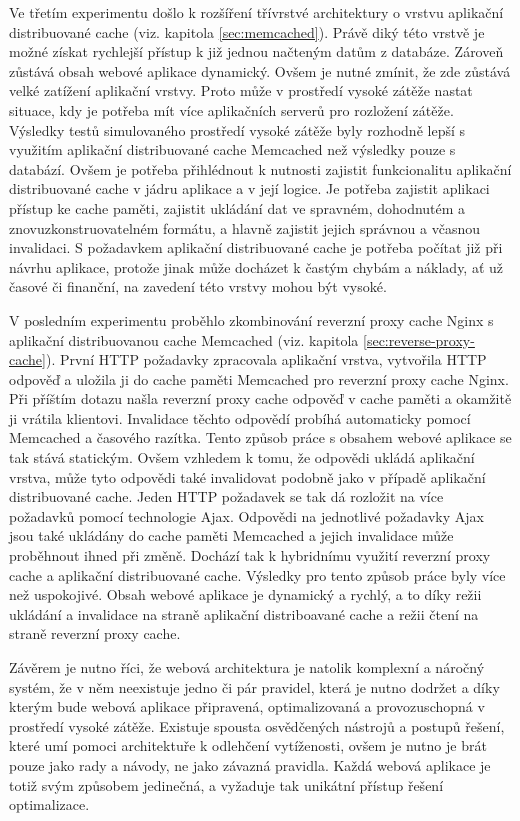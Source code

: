 \documentclass[12pt]{article}
\begin{document}
Ve třetím experimentu došlo k rozšíření třívrstvé architektury o vrstvu aplikační distribuované cache (viz. kapitola \ref{sec:memcached}). Právě diký této vrstvě je možné získat rychlejší přístup k již jednou načteným datům z databáze. Zároveň zůstává obsah webové aplikace dynamický. Ovšem je nutné zmínit, že zde zůstává velké zatížení aplikační vrstvy. Proto může v prostředí vysoké zátěže nastat situace, kdy je potřeba mít více aplikačních serverů pro rozložení zátěže. Výsledky testů simulovaného prostředí vysoké zátěže byly rozhodně lepší s využitím aplikační distribuované cache Memcached než výsledky pouze s databází. Ovšem je potřeba přihlédnout k nutnosti zajistit funkcionalitu aplikační distribuované cache v jádru aplikace a v její logice. Je potřeba zajistit aplikaci přístup ke cache paměti, zajistit ukládání dat ve spravném, dohodnutém a znovuzkonstruovatelném formátu, a hlavně zajistit jejich správnou a včasnou invalidaci. S požadavkem aplikační distribuované cache je potřeba počítat již při návrhu aplikace, protože jinak může docházet k častým chybám a náklady, ať už časové či finanční, na zavedení této vrstvy mohou být vysoké.

V posledním experimentu proběhlo zkombinování reverzní proxy cache Nginx s aplikační distribuovanou cache Memcached (viz. kapitola \ref{sec:reverse-proxy-cache}). První HTTP požadavky zpracovala aplikační vrstva, vytvořila HTTP odpověď a uložila ji do cache paměti Memcached pro reverzní proxy cache Nginx. Při příštím dotazu našla reverzní proxy cache odpověď v cache paměti a okamžitě ji vrátila klientovi. Invalidace těchto odpovědí probíhá automaticky pomocí Memcached a časového razítka. Tento způsob práce s obsahem webové aplikace se tak stává statickým. Ovšem vzhledem k tomu, že odpovědi ukládá aplikační vrstva, může tyto odpovědi také invalidovat podobně jako v případě aplikační distribuované cache. Jeden HTTP požadavek se tak dá rozložit na více požadavků pomocí technologie Ajax. Odpovědi na jednotlivé požadavky Ajax jsou také ukládány do cache paměti Memcached a jejich invalidace může proběhnout ihned při změně. Dochází tak k hybridnímu využití reverzní proxy cache a aplikační distribuované cache. Výsledky pro tento způsob práce byly více než uspokojivé. Obsah webové aplikace je dynamický a rychlý, a to díky režii ukládání a invalidace na straně aplikační distriboavané cache a režii čtení na straně reverzní proxy cache.

Závěrem je nutno říci, že webová architektura je natolik komplexní a náročný systém, že v něm neexistuje jedno či pár pravidel, která je nutno dodržet a díky kterým bude webová aplikace připravená, optimalizovaná a provozuschopná v prostředí vysoké zátěže. Existuje spousta osvědčených nástrojů a postupů řešení, které umí pomoci architektuře k odlehčení vytíženosti, ovšem je nutno je brát pouze jako rady a návody, ne jako závazná pravidla. Každá webová aplikace je totiž svým způsobem jedinečná, a vyžaduje tak unikátní přístup řešení optimalizace. 
\end{document}
